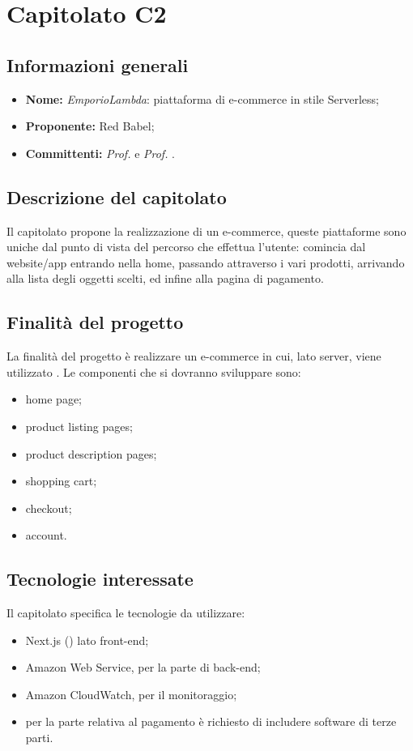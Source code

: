 \section{Capitolato C2}

\subsection{Informazioni generali}
\begin{itemize}
\item \textbf{Nome:} \textit{EmporioLambda}:  piattaforma di e-commerce in stile Serverless;
\item \textbf{Proponente:} Red Babel;
\item \textbf{Committenti:} \textit{Prof. \Tullio{}} e \textit{Prof. \Riccardo{}}.
\end{itemize}

\subsection{Descrizione del capitolato}
Il capitolato propone la realizzazione di un e-commerce, queste piattaforme sono uniche dal punto di vista del percorso che effettua l'utente: comincia dal website/app entrando nella home, passando attraverso i vari prodotti, arrivando alla lista degli oggetti scelti, ed infine alla pagina di pagamento. 

\subsection{Finalità del progetto}
La finalità del progetto è realizzare un e-commerce in cui, lato server, viene utilizzato . Le componenti che si dovranno sviluppare sono:
\begin{itemize}
\item home page;
\item product listing pages;
\item product description pages;
\item shopping cart;
\item checkout;
\item account.
\end{itemize}

\subsection{Tecnologie interessate}
Il capitolato specifica le tecnologie da utilizzare:
\begin{itemize}
\item Next.js () lato front-end;
\item Amazon Web Service, per la parte di back-end;
\item Amazon CloudWatch, per il monitoraggio;
\item per la parte relativa al pagamento è richiesto di includere software di terze parti.
\end{itemize}

